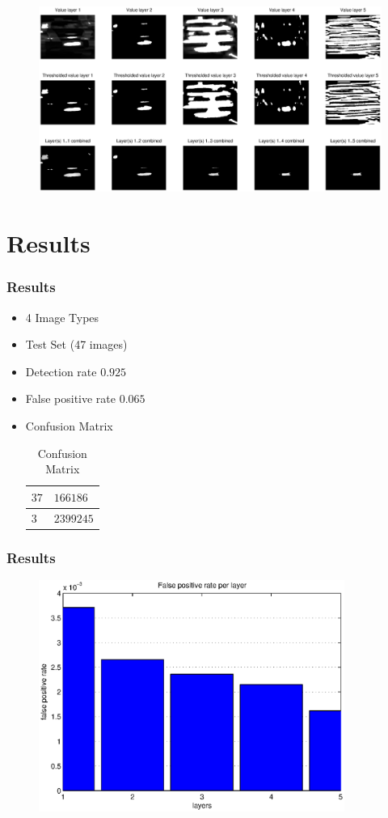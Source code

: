 \documentclass{beamer}
\begin{document}
\frame
{
	\begin{figure}[!ht]
	\centering
	\includegraphics[width=12cm]{../report/img/cascader_img14}
	\label{fig:cascader}
	\end{figure}
}

\section{Results}
\frame
{
  \frametitle{Results}
	
  \begin{itemize}
  \item <+-| alert@+> 4 Image Types
  \item <+-| alert@+> Test Set (47 images)
  \item <+-| alert@+> Detection rate $0.925$
  \item <+-| alert@+> False positive rate $0.065$
  \item <+-| alert@+> Confusion Matrix
  \begin{table}[!ht]
  \centering
  \begin{tabular}{|l|l|}
  \hline
  $37$ & $166186$ \\
  \hline
  $3$  & $2399245$ \\
  \hline
  \end{tabular}
  \caption{Confusion Matrix}
  \label{tab:conf}
  \end{table}
  \end{itemize}
}

\frame
{
  \frametitle{Results}
  \begin{figure}[!ht]
  \centering
  \includegraphics[width=10cm]{../report/img/fprate}
  \end{figure}
}
\end{document}
